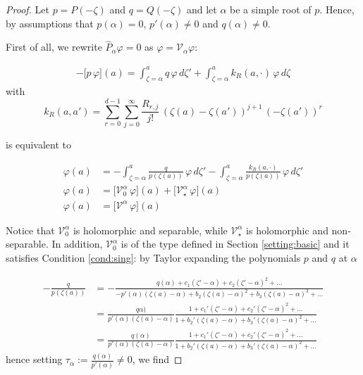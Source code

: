 \documentclass{article}
\theoremstyle{plain}
\newcommand{\volterra}{\mathcal{V}}
\newcommand{\hardpart}{\mathcal{V}_0}
\newcommand{\softpart}{\mathcal{V}_\star}
\begin{document}
\begin{proof}
Let $p = P(-\zeta)$ and $q = Q(-\zeta)$ and let $\alpha$ be a simple root of $p$. Hence, by assumptions that $p(\alpha)=0$, $p'(\alpha)\neq 0$ and $q(\alpha)\neq 0$. 

First of all, we rewrite $\hat{P}_{\alpha}\varphi=0$ as $\varphi = \volterra_\alpha \varphi $: %

\begin{align*}
    -\big[ p\, \varphi \big](a)= \int_{\zeta=\alpha}^a q  \, \varphi \, d\zeta' + \int_{\zeta=\alpha}^a k_R(a,\cdot)  \, \varphi \, d\zeta
\end{align*}
with \[k_R(a,a')=\sum_{r=0}^{d-1}\sum_{j=0}^\infty \frac{R_{r,j}}{j!} \, (\zeta(a)-\zeta(a'))^{j+1} \, (-\zeta(a'))^r\]  

is equivalent to 

\begin{align}
   \nonumber \varphi (a)& =-\int_{\zeta=\alpha}^a \frac{q}{p(\zeta(a))}  \, \varphi \, d\zeta' - \int_{\zeta=\alpha}^a \frac{k_R(a,\cdot)}{p(\zeta(a))}  \, \varphi \, d\zeta' \\
   \nonumber \varphi (a)& =\Big[ \hardpart^\alpha \, \varphi \Big](a)+ \Big[\softpart^\alpha \, \varphi\Big](a) \\
   \varphi(a) &=\Big[ \volterra^\alpha \, \varphi \Big](a)
\end{align}

Notice that $\hardpart^\alpha$ is holomorphic and separable, while $\softpart^\alpha$ is holomorphic and non-separable. In addition, $\hardpart^\alpha$ is of the type defined in Section \ref{setting:basic} and it satisfies Condition \eqref{cond:sing}: by Taylor expanding the polynomials $p$ and $q$ at $\alpha$

\begin{align*}
    -\frac{q}{p(\zeta(a))}&=-\frac{q(\alpha)+c_1(\zeta'-\alpha)+c_2 (\zeta'-\alpha)^2+...}{-p'(\alpha)(\zeta(a)-\alpha)+ b_2 (\zeta(a)-\alpha)^2+b_3(\zeta(a)-\alpha)^3+...}\\
    &=\frac{q\alpha)}{p'(\alpha)(\zeta(a)-\alpha)}\frac{1+c_1'(\zeta'-\alpha)+c_2' (\zeta'-\alpha)^2+...}{1+ b_2' (\zeta(a)-\alpha)+b_3'(\zeta(a)-\alpha)^2+...}\\
    &=\frac{q(\alpha)}{p'(\alpha)(\zeta(a)-\alpha)}\frac{1+c_1'(\zeta'-\alpha)+c_2' (\zeta'-\alpha)^2+...}{1+b_2' (\zeta(a)-\alpha)+b_3'(\zeta(a)-\alpha)^2+...}
\end{align*}
hence setting $\tau_\alpha:=\frac{q(\alpha)}{p'(\alpha)}\neq 0$, we find


\end{proof}
\end{document}

